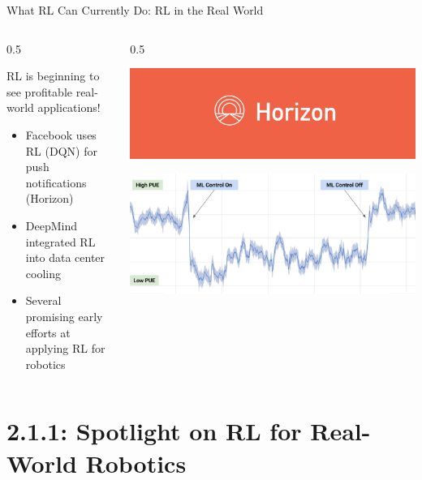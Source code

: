 \documentclass[9pt]{beamer}
\newcommand{\twocolumns}[4]{
\begin{columns}
\begin{column}{#1\textwidth}
    #3
\end{column}
\begin{column}{#2\textwidth}
	#4
\end{column}
\end{columns}
}
\begin{document}
\begin{frame}{What RL Can Currently Do: RL in the Real World}

\twocolumns{0.5}{0.5}{
RL is beginning to see profitable real-world applications!
\begin{itemize}
\item Facebook uses RL (DQN) for push notifications (Horizon)
\item DeepMind integrated RL into data center cooling 
\item Several promising early efforts at applying RL for robotics
\end{itemize}
}{

\includegraphics[width=\textwidth]{p2-horizon}


\includegraphics[width=\textwidth]{p2-datacenter}
}

\end{frame}

\section{2.1.1: Spotlight on RL for Real-World Robotics}
\end{document}
